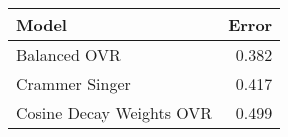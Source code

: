 \begin{tabular}{lr}
\toprule
                           Model &  Error \\
\midrule
                    Balanced OVR &  0.382 \\
                  Crammer Singer &  0.417 \\
        Cosine Decay Weights OVR &  0.499 \\
\bottomrule
\end{tabular}
